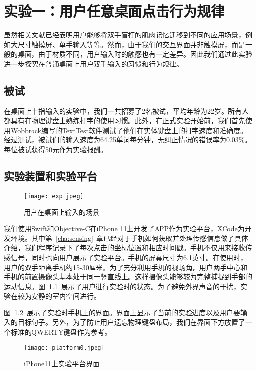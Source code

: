 \chapter{实验一：用户任意桌面点击行为规律}
\label{cha:exp1}
虽然相关文献已经表明用户能够将双手盲打的肌肉记忆迁移到不同的应用场景，例如大尺寸触摸屏、单手输入等等。然而，由于我们的交互界面并非触摸屏，而是一般的桌面，由于材质不同，用户输入时的触感也有一定差异。因此我们通过此实验进一步探究在普通桌面上用户双手输入的习惯和行为规律。


\section{被试}
在桌面上十指输入的实验中，我们一共招募了2名被试，平均年龄为22岁。所有人都具有在物理键盘上熟练打字的使用习惯。此外，在正式实验开始前，我们首先使用Wobbrock编写的TextTest软件\cite{texttest}\cite{wobbrock2006analyzing}测试了他们在实体键盘上的打字速度和准确度。经过测试，被试们的输入速度为64.25单词每分钟，无纠正情况的错误率为0.03\%。每位被试获得50元作为实验报酬。

\section{实验装置和实验平台}
\begin{figure}[h] %
    \centering
    \texttt{[image: exp.jpeg]}
    \caption{用户在桌面上输入的场景}
    \label{fig:exp}
\end{figure}
我们使用Swift和Objective-C在iPhone 11上开发了APP作为实验平台，XCode为开发环境。其中第~\ref{cha:sensing}~章已经对于手机如何获取并处理传感信息做了具体介绍，我们程序记录下了每次点击的坐标位置和相应时间戳。手机不仅用来接收传感信号，同时也向用户展示了实验平台。手机的屏幕尺寸为6.1英寸。在使用时，用户的双手距离手机约15-30厘米。为了充分利用手机的视场角，用户两手中心和手机的前置摄像头基本处于同一竖直线上。这样摄像头能够较为完整捕捉到手部的运动信息。图~\ref{fig:exp}~展示了用户进行实验时的状态。为了避免外界声音的干扰，实验在较为安静的室内空间进行。

图~\ref{fig:platform0}~展示了实验时手机上的界面。界面上显示了当前的实验进度以及用户要输入的目标句子。另外，为了防止用户遗忘物理键盘布局，我们在界面下方放置了一个标准的QWERTY键盘作为参考。

\begin{figure}[h] %
    \centering
    \texttt{[image: platform0.jpeg]}
    \caption{iPhone11上实验平台界面}
    \label{fig:platform0}
\end{figure}


